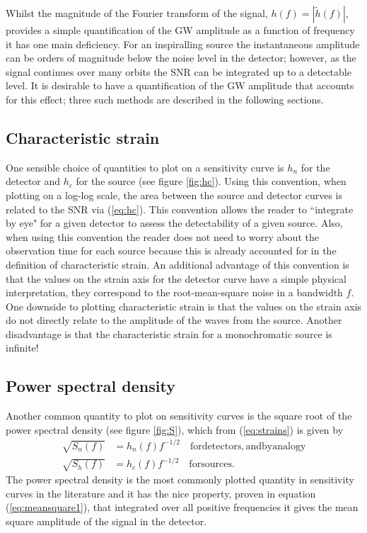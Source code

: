 Whilst the magnitude of the Fourier transform of the signal, $h(f)=\left|\tilde{h}(f)\right|$, provides a simple quantification of the GW amplitude as a function of frequency it has one main deficiency. For an inspiralling source the instantaneous amplitude can be orders of magnitude below the noise level in the detector; however, as the signal continues over many orbits the SNR can be integrated up to a detectable level. It is desirable to have a quantification of the GW amplitude that accounts for this effect; three such methods are described in the following sections.

\subsection{Characteristic strain}
One sensible choice of quantities to plot on a sensitivity curve is $h_{n}$ for the detector and $h_{c}$ for the source (see figure \ref{fig:hc}). Using this convention, when plotting on a log-log scale, the area between the source and detector curves is related to the SNR via (\ref{eq:hc}). This convention allows the reader to ``integrate by eye" for a given detector to assess the detectability of a given source. Also, when using this convention the reader does not need to worry about the observation time for each source because this is already accounted for in the definition of characteristic strain. An additional advantage of this convention is that the values on the strain axis for the detector curve have a simple physical interpretation, they correspond to the root-mean-square noise in a bandwidth $f$. One downside to plotting characteristic strain is that the values on the strain axis do not directly relate to the amplitude of the waves from the source. Another disadvantage is that the characteristic strain for a monochromatic source is infinite!


\subsection{Power spectral density}\label{sec:psd}
Another common quantity to plot on sensitivity curves is the square root of the power spectral density (see figure \ref{fig:S}), which from (\ref{eq:strains}) is given by
\begin{eqnarray}\label{eq:temp1} \sqrt{S_{n}(f)}&=h_{n}(f)f^{-1/2} \quad \mathrm{for detectors, and by analogy} \\
\sqrt{S_{h}(f)}&=h_{c}(f)f^{-1/2} \quad \mathrm{for sources.}\label{eq:ShforSources}\end{eqnarray}
The power spectral density is the most commonly plotted quantity in sensitivity curves in the literature and it has the nice property, proven in equation (\ref{eq:meansquare1}), that integrated over all positive frequencies it gives the mean square amplitude of the signal in the detector.

